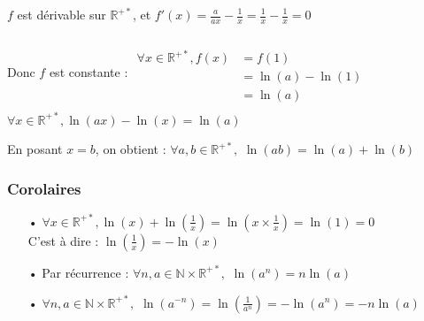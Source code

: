 \documentclass[a4paper, twoside]{article}
\begin{document}
	\vspace{3 mm}					
											
	$f$ est dérivable sur $\mathbb{R}^{+*}$, et $f'(x) = \frac{a}{ax} - \frac{1}{x} = \frac{1}{x} - \frac{1}{x} = 0$

	\vspace{-5 mm}

	Donc $f$ est constante : $\begin{array}{ll}
	&\\
	&\\
							\forall x \in \mathbb{R}^{+*}, f(x) & = f(1)\\
																& = \ln(a) - \ln(1)\\
																& = \ln(a)\\
							\end{array}$\\

	$\forall x \in \mathbb{R}^{+*}, \ln(ax) - \ln(x) = \ln(a)$

	En posant $x = b$, on obtient : $ \forall a, b \in \mathbb{R}^{+*},$ {\Large $ \ln(ab) = \ln(a) + \ln(b)$}





	\subsubsection*{Corolaires}

	\begin{itemize}

		\item[•] {\large $\forall x \in \mathbb{R}^{+*}, \ln(x)+\ln\left(\frac{1}{x}\right) = \ln\left(x \times \frac{1}{x}\right) = \ln(1) = 0$}\\
		C'est à dire : {\large $\ln\left(\frac{1}{x}\right) = - \ln(x)$}\\
		
		\item[•] Par récurrence : $\forall n, a \in \mathbb{N}\times\mathbb{R}^{+*},$ {\large$ \ln(a^n) = n\ln(a)$}\\
		
		\item[•] $\forall n, a \in \mathbb{N}\times\mathbb{R}^{+*},$ {\large $ \ln(a^{-n}) = \ln\left(\frac{1}{a^n}\right) = - \ln(a^n) = - n \ln(a)$}\\

	\end{itemize}

	\vspace{-3mm}
\end{document}
